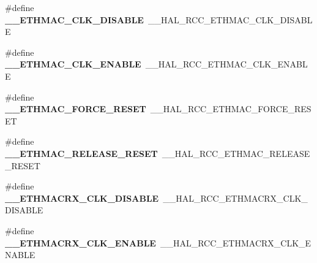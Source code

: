 \begin{DoxyCompactItemize}
\item 
\hypertarget{group___h_a_l___r_c_c___aliased_ga66ef6d7fc598a25a812e475c9382a730}{\#define {\bfseries \-\_\-\-\_\-\-E\-T\-H\-M\-A\-C\-\_\-\-C\-L\-K\-\_\-\-D\-I\-S\-A\-B\-L\-E}~\-\_\-\-\_\-\-H\-A\-L\-\_\-\-R\-C\-C\-\_\-\-E\-T\-H\-M\-A\-C\-\_\-\-C\-L\-K\-\_\-\-D\-I\-S\-A\-B\-L\-E}\label{group___h_a_l___r_c_c___aliased_ga66ef6d7fc598a25a812e475c9382a730}

\item 
\hypertarget{group___h_a_l___r_c_c___aliased_ga13de83bd7b04abc2ea4b6c7475727318}{\#define {\bfseries \-\_\-\-\_\-\-E\-T\-H\-M\-A\-C\-\_\-\-C\-L\-K\-\_\-\-E\-N\-A\-B\-L\-E}~\-\_\-\-\_\-\-H\-A\-L\-\_\-\-R\-C\-C\-\_\-\-E\-T\-H\-M\-A\-C\-\_\-\-C\-L\-K\-\_\-\-E\-N\-A\-B\-L\-E}\label{group___h_a_l___r_c_c___aliased_ga13de83bd7b04abc2ea4b6c7475727318}

\item 
\hypertarget{group___h_a_l___r_c_c___aliased_ga68a672e5bd43e43c4c851f8d6b44c88c}{\#define {\bfseries \-\_\-\-\_\-\-E\-T\-H\-M\-A\-C\-\_\-\-F\-O\-R\-C\-E\-\_\-\-R\-E\-S\-E\-T}~\-\_\-\-\_\-\-H\-A\-L\-\_\-\-R\-C\-C\-\_\-\-E\-T\-H\-M\-A\-C\-\_\-\-F\-O\-R\-C\-E\-\_\-\-R\-E\-S\-E\-T}\label{group___h_a_l___r_c_c___aliased_ga68a672e5bd43e43c4c851f8d6b44c88c}

\item 
\hypertarget{group___h_a_l___r_c_c___aliased_gad4bf3cdd9d3a359b455185e90512517c}{\#define {\bfseries \-\_\-\-\_\-\-E\-T\-H\-M\-A\-C\-\_\-\-R\-E\-L\-E\-A\-S\-E\-\_\-\-R\-E\-S\-E\-T}~\-\_\-\-\_\-\-H\-A\-L\-\_\-\-R\-C\-C\-\_\-\-E\-T\-H\-M\-A\-C\-\_\-\-R\-E\-L\-E\-A\-S\-E\-\_\-\-R\-E\-S\-E\-T}\label{group___h_a_l___r_c_c___aliased_gad4bf3cdd9d3a359b455185e90512517c}

\item 
\hypertarget{group___h_a_l___r_c_c___aliased_ga2fdcbe11c1caa9f4868d73b309c13b56}{\#define {\bfseries \-\_\-\-\_\-\-E\-T\-H\-M\-A\-C\-R\-X\-\_\-\-C\-L\-K\-\_\-\-D\-I\-S\-A\-B\-L\-E}~\-\_\-\-\_\-\-H\-A\-L\-\_\-\-R\-C\-C\-\_\-\-E\-T\-H\-M\-A\-C\-R\-X\-\_\-\-C\-L\-K\-\_\-\-D\-I\-S\-A\-B\-L\-E}\label{group___h_a_l___r_c_c___aliased_ga2fdcbe11c1caa9f4868d73b309c13b56}

\item 
\hypertarget{group___h_a_l___r_c_c___aliased_ga3568b7579d0d56fe1184a8bd8ba6dcc4}{\#define {\bfseries \-\_\-\-\_\-\-E\-T\-H\-M\-A\-C\-R\-X\-\_\-\-C\-L\-K\-\_\-\-E\-N\-A\-B\-L\-E}~\-\_\-\-\_\-\-H\-A\-L\-\_\-\-R\-C\-C\-\_\-\-E\-T\-H\-M\-A\-C\-R\-X\-\_\-\-C\-L\-K\-\_\-\-E\-N\-A\-B\-L\-E}\label{group___h_a_l___r_c_c___aliased_ga3568b7579d0d56fe1184a8bd8ba6dcc4}


\end{DoxyCompactItemize}
